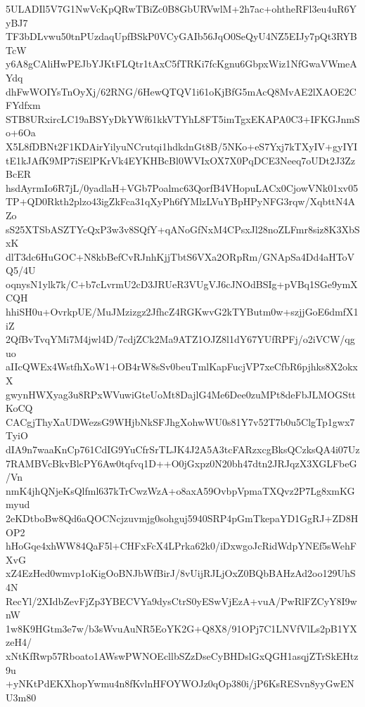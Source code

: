 5ULADIl5V7G1NwVcKpQRwTBiZc0B8GbURVwlM+2h7ac+ohtheRFl3eu4uR6YyBJ7
TF3bDLvwu50tnPUzdaqUpfBSkP0VCyGAIb56JqO0SeQyU4NZ5EIJy7pQt3RYBTcW
y6A8gCAliHwPEJbYJKtFLQtr1tAxC5fTRKi7fcKgnu6GbpxWiz1NfGwaVWmeAYdq
dhFwWOIYsTnOyXj/62RNG/6HewQTQV1i61oKjBfG5mAcQ8MvAE2lXAOE2CFYdfxm
STB8URxircLC19aBSYyDkYWf61kkVTYhL8FT5imTgxEKAPA0C3+IFKGJnmSo+6Oa
X5L8fDBNt2F1KDAirYilyuNCrutqi1hdkdnGt8B/5NKo+eS7Yxj7kTXyIV+gyIYI
tE1kJAfK9MP7iSElPKrVk4EYKHBcBl0WVIxOX7X0PqDCE3Neeq7oUDt2J3ZzBcER
hsdAyrmIo6R7jL/0yadlaH+VGb7Poalmc63QorfB4VHopuLACx0CjowVNk01xv05
TP+QD0Rkth2plzo43igZkFca31qXyPh6fYMlzLVuYBpHPyNFG3rqw/XqbttN4AZo
sS25XTSbASZTYcQxP3w3v8SQfY+qANoGfNxM4CPsxJl28noZLFmr8siz8K3XbSxK
dlT3dc6HuGOC+N8kbBefCvRJnhKjjTbtS6VXa2ORpRm/GNApSa4Dd4aHToVQ5/4U
oqnysN1ylk7k/C+b7cLvrmU2cD3JRUeR3VUgVJ6cJNOdBSIg+pVBq1SGe9ymXCQH
hhiSH0u+OvrkpUE/MuJMzizgz2JfhcZ4RGKwvG2kTYButm0w+szjjGoE6dmfX1iZ
2QfBvTvqYMi7M4jwl4D/7cdjZCk2Ma9ATZ1OJZ8l1dY67YUfRPFj/o2iVCW/qguo
aIIcQWEx4WstfhXoW1+OB4rW8sSv0beuTmlKapFucjVP7xeCfbR6pjhks8X2okxX
gwynHWXyag3u8RPxWVuwiGteUoMt8DajlG4Me6Dee0zuMPt8deFbJLMOGSttKoCQ
CACgjThyXaUDWezsG9WHjbNkSFJhgXohwWU0s81Y7v52T7b0u5ClgTp1gwx7TyiO
dIA9n7waaKnCp761CdIG9YuCfrSrTLJK4J2A5A3tcFARzxcgBksQCzksQA4i07Uz
7RAMBVcBkvBlcPY6Aw0tqfvq1D++O0jGxpz0N20bh47dtn2JRJqzX3XGLFbeG/Vn
nmK4jhQNjeKsQlfml637kTrCwzWzA+o8axA59OvbpVpmaTXQvz2P7Lg8xmKGmyud
2eKDtboBw8Qd6aQOCNcjzuvmjg0sohguj5940SRP4pGmTkepaYD1GgRJ+ZD8HOP2
hHoGqe4xhWW84QaF5l+CHFxFcX4LPrka62k0/iDxwgoJcRidWdpYNEf5sWehFXvG
xZ4EzHed0wmvp1oKigOoBNJbWfBirJ/8vUijRJLjOxZ0BQbBAHzAd2oo129UhS4N
RecYl/2XIdbZevFjZp3YBECVYa9dysCtrS0yESwVjEzA+vuA/PwRlFZCyY8I9wnW
1w8K9HGtm3e7w/b3sWvuAuNR5EoYK2G+Q8X8/91OPj7C1LNVfVlLs2pB1YXzeH4/
xNtKfRwp57Rboato1AWswPWNOEcllbSZzDseCyBHDslGxQGH1asqjZTrSkEHtz9u
+yNKtPdEKXhopYwmu4n8fKvlnHFOYWOJz0qOp380i/jP6KsRESvn8yyGwENU3m80
